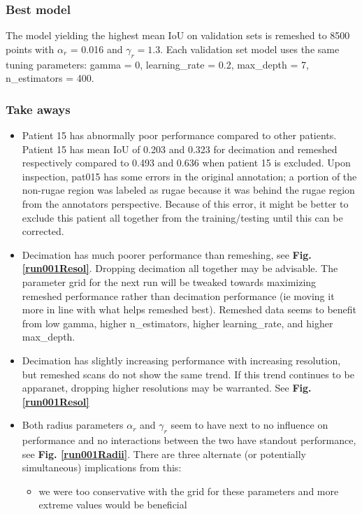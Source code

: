 \documentclass[11pt]{article}
\theoremstyle{definition}
\begin{document}
\subsubsection{Best model}

The model yielding the highest mean IoU on validation sets is remeshed to 8500 points with $\alpha_r$ = 0.016 and $\gamma_r = 1.3$. Each validation set model uses the same tuning parameters: gamma = 0, learning\_rate = 0.2, max\_depth = 7, n\_estimators = 400. 

\subsubsection{Take aways}

\begin{itemize}
    \item Patient 15 has abnormally poor performance compared to other patients. Patient 15 has mean IoU of 0.203 and 0.323 for decimation and remeshed respectively compared to 0.493 and 0.636 when patient 15 is excluded. Upon inspection, pat015 has some errors in the original annotation; a portion of the non-rugae region was labeled as rugae because it was behind the rugae region from the annotators perspective. Because of this error, it might be better to exclude this patient all together from the training/testing until this can be corrected.
    \item Decimation has much poorer performance than remeshing, see \textbf{Fig. \ref{run001Resol}}. Dropping decimation all together may be advisable. The parameter grid for the next run will be tweaked towards maximizing remeshed performance rather than decimation performance (ie moving it more in line with what helps remeshed best). Remeshed data seems to benefit from low gamma, higher n\_estimators, higher learning\_rate, and higher max\_depth.
    \item Decimation has slightly increasing performance with increasing resolution, but remeshed scans do not show the same trend. If this trend continues to be apparanet, dropping higher resolutions may be warranted. See \textbf{Fig. \ref{run001Resol}}
    \item Both radius parameters $\alpha_r$ and $\gamma_r$ seem to have next to no influence on performance and no interactions between the two have standout performance, see \textbf{Fig. \ref{run001Radii}}. There are three alternate (or potentially simultaneous) implications from this:
    \begin{itemize}
        \item we were too conservative with the grid for these parameters and more extreme values would be beneficial

\end{itemize}
\end{itemize}
\end{document}

